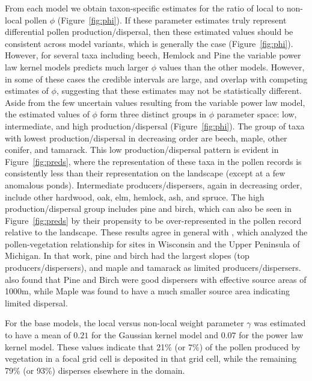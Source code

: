 \documentclass[12pt]{article}
\begin{document}
From each model we obtain taxon-specific estimates for the ratio of
local to non-local pollen $\phi$ (Figure~\ref{fig:phi}). If these
parameter estimates truly represent differential pollen
production/dispersal, then these estimated values should be consistent
across model variants, which is generally the case
(Figure~\ref{fig:phi}). However, for several taxa including beech,
Hemlock and Pine the variable power law kernel models predicts much
larger $\phi$ values than the other models. However, in some of these
cases the credible intervals are large, and overlap with competing
estimates of $\phi$, suggesting that these estimates may not be
statistically different. Aside from the few uncertain values resulting
from the variable power law model, the estimated values of $\phi$ form
three distinct groups in $\phi$ parameter space: low, intermediate,
and high production/dispersal (Figure~\ref{fig:phi}). The group of
taxa with lowest production/dispersal in decreasing order are beech,
maple, other conifer, and tamarack. This low production/dispersal
pattern is evident in Figure~\ref{fig:preds}, where the representation
of these taxa in the pollen records is consistently less than their
representation on the landscape (except at a few anomalous
ponds). Intermediate producers/dispersers, again in decreasing order,
include other hardwood, oak, elm, hemlock, ash, and spruce. The high
production/dispersal group includes pine and birch, which can also be
seen in Figure~\ref{fig:preds} by their propensity to be
over-represented in the pollen record relative to the landscape. These
results agree in general with \citep{prentice1986}, which analyzed the
pollen-vegetation relationship for sites in Wisconsin and the Upper
Peninsula of Michigan. In that work, pine and birch had the largest
slopes (top producers/dispersers), and maple and tamarack as limited
producers/dispersers. \citep{jackson1990} also found that Pine and
Birch were good dispersers with effective source areas of 1000m, while
Maple was found to have a much smaller source area indicating limited
dispersal.

For the base models, the local versus non-local weight parameter
$\gamma$ was estimated to have a mean of $0.21$ for the Gaussian
kernel model and $0.07$ for the power law kernel model. These values
indicate that 21\% (or 7\%) of the pollen produced by vegetation in a
focal grid cell is deposited in that grid cell, while the remaining
79\% (or 93\%) disperses elsewhere in the domain.
\end{document}
